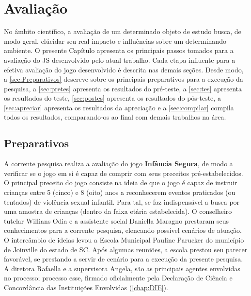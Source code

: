 \chapter{Avaliação}\label{ch:Avaliacao}

No âmbito científico, a avaliação de um determinado objeto de estudo busca, de modo geral, elúcidar seu real impacto e influências sobre um determinando ambiente. O presente Capítulo apresenta os principais passos tomados para a avaliação do \ac{JS} desenvolvido pelo atual trabalho. Cada etapa influente para a efetiva avaliação do jogo desenvolvido é descrita nas demais seções. Desde modo, a \autoref{sec:Preparativos} descreve sobre os principais preparativos para a execução da pesquisa, a \autoref{sec:pretes} apresenta os resultados do pré-teste, a \autoref{sec:tes} apresenta os resultados do teste, \autoref{sec:postes} apresenta os resultados do pós-teste, a \autoref{sec:apreciar} apresenta os resultados da apreciação e a \autoref{sec:compilar} compila todos os resultados, comparando-os ao final com demais trabalhos na área. 

\section{Preparativos}\label{sec:Preparativos}

A corrente pesquisa realiza a avaliação do jogo \textbf{Infância Segura}, de modo a verificar se o jogo em si é capaz de comprir com seus preceitos pré-estabelecidos. O principal preceito do jogo consiste na ideia de que o jogo é capaz de instruir crianças entre 5 (cinco) e 8 (oito) anos a reconhecerem eventos praticados (ou tentados) de violência sexual infantil. Para tal, se faz indispensável a busca por uma amostra de crianças (dentro da faixa etária estabelecida). O conselheiro tutelar Willians Odia e a assistente social Daniella Maragno prestaram seus conhecimentos para a corrente pesquisa, elencando possível cenários de atuação. O intercâmbio de ideias levou a Escola Municipal Pauline Parucker do município de Joinville do estado de \ac{SC}. Após algumas reuniões, a escola prestou seu parecer favorável, se prestando a servir de cenário para a execução da presente pesquisa. A diretora Rafaella e a supervisora Angela, são as principais agentes envolvidas no processo; processo esse, firmado oficialmente pela Declaração de Ciência e Concordância das Instituições Envolvidas (\autoref{chap:DIE}). 

